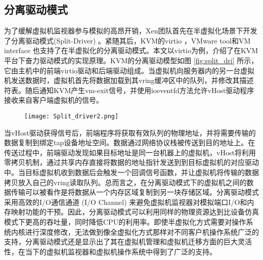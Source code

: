\subsection{分离驱动模式}
为了缓解虚拟机监视器参与模拟的高昂开销，Xen团队首先在半虚拟化场景下开发了分离驱动模式(Split-Driver)  。紧随其后，KVM的virtio  ，VMware tool和VM interface  也支持了在半虚拟化的分离驱动模式。本文以virtio为例，介绍了在KVM平台下奋力驱动模式的实现原理。KVM的分离驱动模型如图 \ref{fig:split_dri} 所示，它由主机中的前端virtio驱动和后端驱动组成。当虚拟机向服务器内的另一台虚拟机发送数据时，虚拟机首先将数据加载到其vring缓冲区中的队列，并修改其描述符表。随后通知KVM产生vm-exit信号，并使用ioeventfd方法允许vHost驱动程序接收来自客户端虚拟机的信号。
\begin{figure}[!htp]
	\centering
	\texttt{[image: Split\_driver2.png]}
\end{figure}
当vHost驱动获得信号后，前端程序将获取有效队列的物理地址，并将需要传输的数据复制到绑定tap设备地址空间。数据通过网络协议栈被传送到目的地址上。在传送过程中，前端驱动发现如果目标地址是同一台机器上的虚拟机，vHost将利用零拷贝机制，通过共享内存直接将数据的地址指针发送到到目标虚拟机的对应驱动中。当目标虚拟机收到数据后会触发一个回调信号函数，并让虚拟机将传输的数据拷贝放入自己的vring读取队列。总而言之，在分离驱动模式下的虚拟机之间的数据传输可以被看作是将数据从一个内存区域复制到另一块存储区域。分离驱动模式采用高效的I/O通信通道 (I/O Channel) 来避免虚拟机监视器对模拟端口I/O和内存映射功能的干预。因此，分离驱动模式可以利用同样的物理资源达到比设备仿真模式下更高的吞吐量，同时降低CPU的利用率。即使半虚拟化方式需要对操作系统内核进行深度修改，无法做到像全虚拟化方式那样对不同客户机操作系统广泛的支持，分离驱动模式还是显示出了其在虚拟机管理和虚拟机迁移方面的巨大灵活性，在当下的虚拟机监视器和虚拟机操作系统中得到了广泛的支持。


